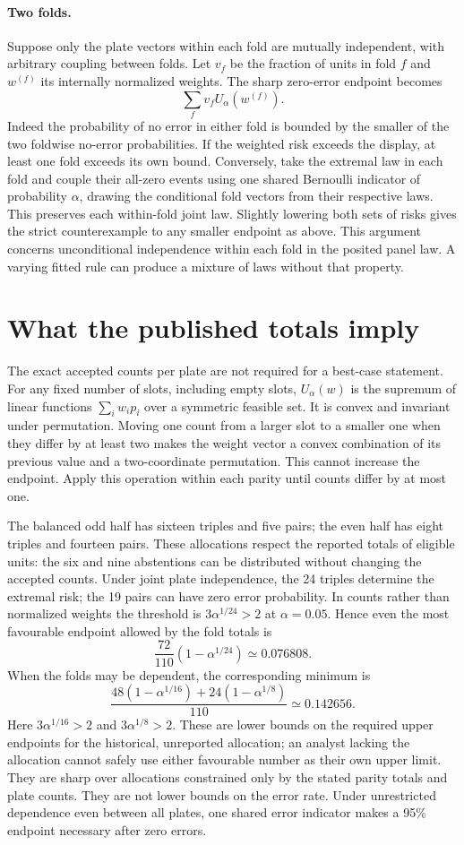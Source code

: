 \documentclass[11pt]{article}
\begin{document}
\paragraph{Two folds.} Suppose only the plate vectors within each fold are mutually independent, with arbitrary coupling between folds. Let $v_f$ be the fraction of units in fold $f$ and $w^{(f)}$ its internally normalized weights. The sharp zero-error endpoint becomes
\[
                \sum_f v_f U_\alpha(w^{(f)}).
\]
Indeed the probability of no error in either fold is bounded by the smaller of the two foldwise no-error probabilities. If the weighted risk exceeds the display, at least one fold exceeds its own bound. Conversely, take the extremal law in each fold and couple their all-zero events using one shared Bernoulli indicator of probability $\alpha$, drawing the conditional fold vectors from their respective laws. This preserves each within-fold joint law. Slightly lowering both sets of risks gives the strict counterexample to any smaller endpoint as above. This argument concerns unconditional independence within each fold in the posited panel law. A varying fitted rule can produce a mixture of laws without that property.
\newpage
\section{What the published totals imply}
The exact accepted counts per plate are not required for a best-case statement. For any fixed number of slots, including empty slots, $U_\alpha(w)$ is the supremum of linear functions $\sum_i w_i p_i$ over a symmetric feasible set. It is convex and invariant under permutation. Moving one count from a larger slot to a smaller one when they differ by at least two makes the weight vector a convex combination of its previous value and a two-coordinate permutation. This cannot increase the endpoint. Apply this operation within each parity until counts differ by at most one.

The balanced odd half has sixteen triples and five pairs; the even half has eight triples and fourteen pairs. These allocations respect the reported totals of eligible units: the six and nine abstentions can be distributed without changing the accepted counts. Under joint plate independence, the 24 triples determine the extremal risk; the 19 pairs can have zero error probability. In counts rather than normalized weights the threshold is $3\alpha^{1/24}>2$ at $\alpha=0.05$. Hence even the most favourable endpoint allowed by the fold totals is
\[
 \frac{72}{110}(1-\alpha^{1/24})\simeq 0.076808.
\]
When the folds may be dependent, the corresponding minimum is
\[
 \frac{48(1-\alpha^{1/16})+24(1-\alpha^{1/8})}{110}
 \simeq 0.142656.
\]
Here $3\alpha^{1/16}>2$ and $3\alpha^{1/8}>2$. These are lower bounds on the required upper endpoints for the historical, unreported allocation; an analyst lacking the allocation cannot safely use either favourable number as their own upper limit. They are sharp over allocations constrained only by the stated parity totals and plate counts. They are not lower bounds on the error rate. Under unrestricted dependence even between all plates, one shared error indicator makes a 95\% endpoint necessary after zero errors.
\end{document}
